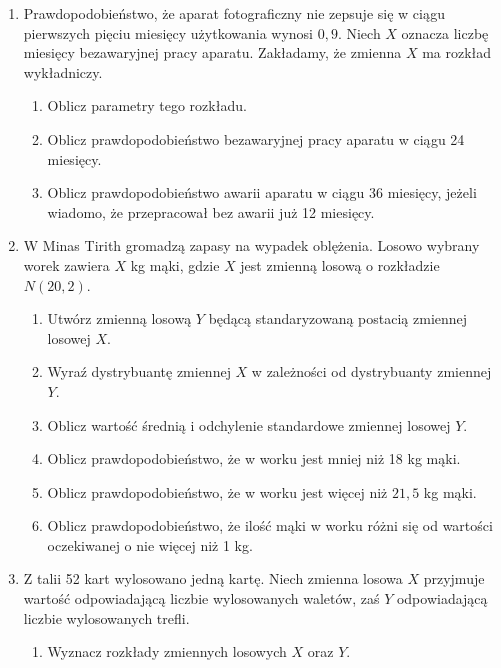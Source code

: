 \documentclass{mwart}
\newcommand{\ans}[1]{}
\begin{document}
\begin{enumerate}
\begin{enumerate}
\end{enumerate}
\item Prawdopodobieństwo, że aparat fotograficzny nie zepsuje się w ciągu pierwszych pięciu miesięcy użytkowania wynosi $0{,}9$. Niech $X$ oznacza liczbę miesięcy bezawaryjnej pracy aparatu. Zakładamy, że zmienna $X$ ma rozkład wykładniczy.
\begin{enumerate}
\item Oblicz parametry tego rozkładu. \ans{$P(X>5)=\exp(-\frac{5}{\lambda}) \quad \lambda=-\frac{5}{\ln 0{,}9}$}
\item Oblicz prawdopodobieństwo bezawaryjnej pracy aparatu w ciągu 24 miesięcy. \ans{$P(X>24)=1-F(24)$}
\item Oblicz prawdopodobieństwo awarii aparatu w ciągu 36 miesięcy, jeżeli wiadomo, że przepracował bez awarii już 12 miesięcy. \ans{$P(X<36|X>12)=P(X<36-12)=F(24)$}
\end{enumerate}
\item W Minas Tirith gromadzą zapasy na wypadek oblężenia. Losowo wybrany worek zawiera $X$ kg mąki, gdzie $X$ jest zmienną losową o rozkładzie $N(20,2)$.
\begin{enumerate}
\item Utwórz zmienną losową $Y$ będącą standaryzowaną postacią zmiennej losowej $X$. \ans{$Y=\frac{X-20}{2}$}
\item Wyraź dystrybuantę zmiennej $X$ w zależności od dystrybuanty zmiennej $Y$. \ans{$F_X(x)=F_Y(\frac{x-20}{2})$}
\item Oblicz wartość średnią i odchylenie standardowe zmiennej losowej $Y$.
\item Oblicz prawdopodobieństwo, że w worku jest mniej niż 18 kg mąki. \ans{$P(X<18)=F_X(18)=F_Y(-1)=1-F_Y(1)=1-0{,}8413\approx 0{,}16$}
\item Oblicz prawdopodobieństwo, że w worku jest więcej niż $21{,}5$ kg mąki. \ans{$P(X>21{,}5)=1-F_X(21{,}5)=1-F_Y(0{,}75)=1-0{,}7734\approx 0{,}23$}
\item Oblicz prawdopodobieństwo, że ilość mąki w worku różni się od wartości oczekiwanej o nie więcej niż 1 kg. \ans{$P(19<X<21)=F_X(21)-F_X(19)=F_Y(0{,}5)-F_Y(-0{,}5)=2F_Y(0{,}5)-1=2\cdot0{,}6915-1=0{,}38$}
\end{enumerate}
\item Z talii 52 kart wylosowano jedną kartę. Niech zmienna losowa $X$ przyjmuje wartość odpowiadającą liczbie wylosowanych waletów, zaś $Y$ odpowiadającą liczbie wylosowanych trefli.
\begin{enumerate}
\item Wyznacz rozkłady zmiennych losowych $X$ oraz $Y$. \ans{$P(X=0)=\frac{48}{52} P(X=1)=\frac{4}{52} P(Y=1)=\frac{13}{52} P(Y=0)=\frac{39}{52}$}

\end{enumerate}
\end{enumerate}
\end{document}

